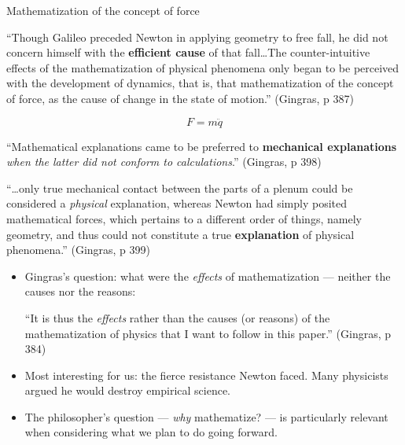 \documentclass[fleqn]{beamer}
\newcommand{\kw}[1]{\textbf{#1}}
\begin{document}
\begin{frame}{Mathematization of the concept of force}

  ``Though Galileo preceded Newton in applying geometry to free fall,
  he did not concern himself with the \kw{efficient cause} of that
  fall\dots The counter-intuitive effects of the mathematization of
  physical phenomena only began to be perceived with the development
  of dynamics, that is, that mathematization of the concept of force,
  as the cause of change in the state of motion.'' (Gingras, p 387)

  \[ F = m\ddot{q} \]

  \medskip
  ``Mathematical explanations came to be preferred to \kw{mechanical
  explanations} \emph{when the latter did not conform to
  calculations}.'' (Gingras, p 398)

\end{frame}

\begin{frame}

  ``\dots only true mechanical contact between the parts of a plenum
  could be considered a \emph{physical} explanation, whereas Newton
  had simply posited mathematical forces, which pertains to a
  different order of things, namely geometry, and thus could not
  constitute a true \kw{explanation} of physical phenomena.''
  (Gingras, p 399)

\end{frame}

\begin{frame}

  \begin{itemize}
  \item Gingras's question: what were the \emph{effects} of
    mathematization --- neither the causes nor the reasons:

    ``It is thus the \emph{effects} rather than the causes (or
    reasons) of the mathematization of physics that I want to follow
    in this paper.'' (Gingras, p 384)

  \item Most interesting for us: the fierce resistance Newton faced.
    Many physicists argued he would destroy empirical science.

  \item The philosopher's question --- \emph{why} mathematize? ---
    is particularly relevant when considering what we plan to do going
    forward.
  \end{itemize}

\end{frame}
\end{document}
